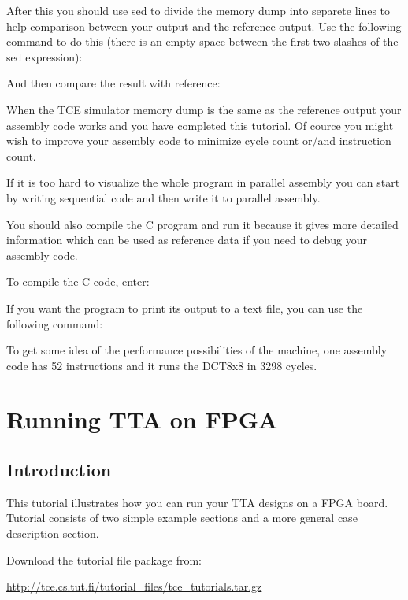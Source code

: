 \documentclass[twoside]{tceusermanual}
\begin{document}
After this you should use sed to divide the memory dump into separete lines
to help comparison between your output and the reference output. Use the
following command to do this (there is an empty space between the
first two slashes of the sed expression):


And then compare the result with reference:


When the TCE simulator memory dump is the same as the reference output your
assembly code works and you have completed this tutorial. Of
cource you might wish to improve your assembly code to minimize cycle
count or/and instruction count.

If it is too hard to visualize the whole program in parallel assembly
you can start by writing sequential code and then write it to
parallel assembly.

You should also compile the C program and run it because it gives more
detailed information which can be used as reference data if you need to debug
your assembly code.

To compile the C code, enter:


If you want the program to print its output to a text file, you can use the
following command:



To get some idea of the performance possibilities of the machine,
one assembly code has 52 instructions and it runs the DCT8x8 in
3298 cycles.


\section{Running TTA on FPGA}
\label{sec:fpgatutorial}

\subsection{Introduction}
This tutorial illustrates how you can run your TTA designs on a FPGA board.
Tutorial consists of two simple example sections and a more general case
description section.

Download the tutorial file package from:

\url{http://tce.cs.tut.fi/tutorial_files/tce_tutorials.tar.gz}\\
\end{document}

